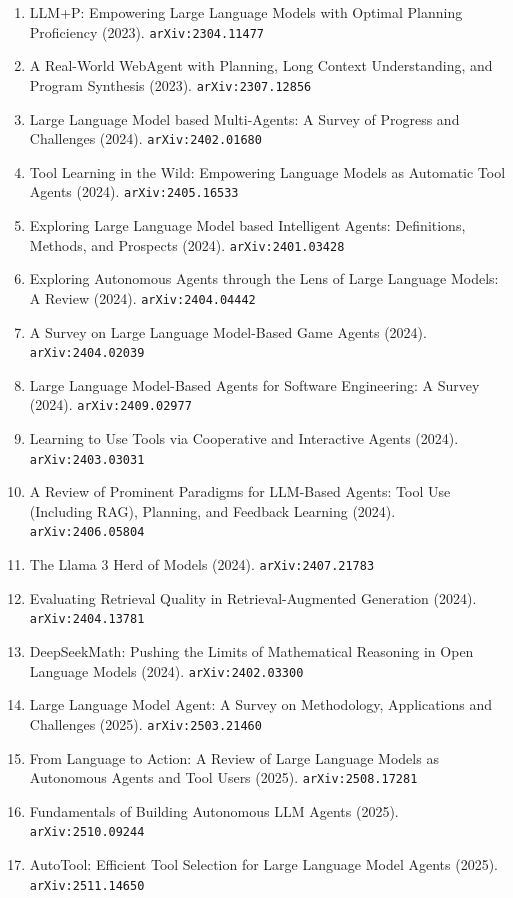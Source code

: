 \documentclass[11pt]{article}
\begin{document}
\begin{enumerate}
  Retrieval-Generation Synergy (2023). \texttt{arXiv:2305.15294}
  \item LLM+P: Empowering Large Language Models with Optimal Planning
  Proficiency (2023). \texttt{arXiv:2304.11477}
  \item A Real-World WebAgent with Planning, Long Context Understanding, and
  Program Synthesis (2023). \texttt{arXiv:2307.12856}
  \item Large Language Model based Multi-Agents: A Survey of Progress and
  Challenges (2024). \texttt{arXiv:2402.01680}
  \item Tool Learning in the Wild: Empowering Language Models as Automatic Tool
  Agents (2024). \texttt{arXiv:2405.16533}
  \item Exploring Large Language Model based Intelligent Agents: Definitions,
  Methods, and Prospects (2024). \texttt{arXiv:2401.03428}
  \item Exploring Autonomous Agents through the Lens of Large Language Models: A
  Review (2024). \texttt{arXiv:2404.04442}
  \item A Survey on Large Language Model-Based Game Agents (2024). \texttt{arXiv:2404.02039}
  \item Large Language Model-Based Agents for Software Engineering: A Survey (2024). \texttt{arXiv:2409.02977}
  \item Learning to Use Tools via Cooperative and Interactive Agents (2024). \texttt{arXiv:2403.03031}
  \item A Review of Prominent Paradigms for LLM-Based Agents: Tool Use
  (Including RAG), Planning, and Feedback Learning (2024). \texttt{arXiv:2406.05804}
  \item The Llama 3 Herd of Models (2024). \texttt{arXiv:2407.21783}
  \item Evaluating Retrieval Quality in Retrieval-Augmented Generation (2024). \texttt{arXiv:2404.13781}
  \item DeepSeekMath: Pushing the Limits of Mathematical Reasoning in Open
  Language Models (2024). \texttt{arXiv:2402.03300}
  \item Large Language Model Agent: A Survey on Methodology, Applications and
  Challenges (2025). \texttt{arXiv:2503.21460}
  \item From Language to Action: A Review of Large Language Models as Autonomous Agents and Tool Users (2025). \texttt{arXiv:2508.17281}
  \item Fundamentals of Building Autonomous LLM Agents (2025). \texttt{arXiv:2510.09244}
  \item AutoTool: Efficient Tool Selection for Large Language Model Agents (2025). \texttt{arXiv:2511.14650}

\end{enumerate}
\end{document}
